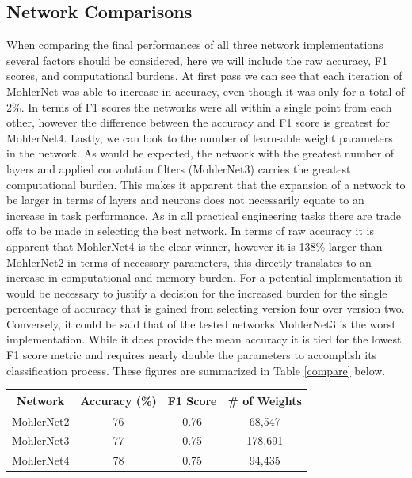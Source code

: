 \documentclass[12pt]{article}
\begin{document}
\subsection{Network Comparisons}
When comparing the final performances of all three network implementations several factors should be considered, here we will include the raw accuracy, F1 scores, and computational burdens. 
At first pass we can see that each iteration of MohlerNet was able to increase in accuracy, even though it was only for a total of 2\%. In terms of F1 scores the networks were all within a single point from each other, however the difference between the accuracy and F1 score is greatest for MohlerNet4. Lastly, we can look to the number of learn-able weight parameters in the network. As would be expected, the network with the greatest number of layers and applied convolution filters (MohlerNet3) carries the greatest computational burden. This makes it apparent that the expansion of a network to be larger in terms of layers and neurons does not necessarily equate to an increase in task performance. As in all practical engineering tasks there are trade offs to be made in selecting the best network. In terms of raw accuracy it is apparent that MohlerNet4 is the clear winner, however it is 138\% larger than MohlerNet2 in terms of necessary parameters, this directly translates to an increase in computational and memory burden. For a potential implementation it would be necessary to justify a decision for the increased burden for the single percentage of accuracy that is gained from selecting version four over version two. Conversely, it could be said that of the tested networks MohlerNet3 is the worst implementation. While it does provide the mean accuracy it is tied for the lowest F1 score metric and requires nearly double the parameters to accomplish its classification process. These figures are summarized in Table \ref{compare} below.




\begin{center}
	\begin{tabular}[5pt]{| c| c| c| c|}
		\hline
		Network	& Accuracy (\%) &F1 Score& \# of Weights\\[0.5ex] 
		\hline 	
		MohlerNet2& 76 & 0.76 & 68,547  \\ \hline 
		MohlerNet3& 77& 0.75 & 178,691  \\ \hline 
		MohlerNet4& 78&0.75& 94,435  \\ \hline 
	\end{tabular}
	\label{compare}
\end{center}	
\end{document}
